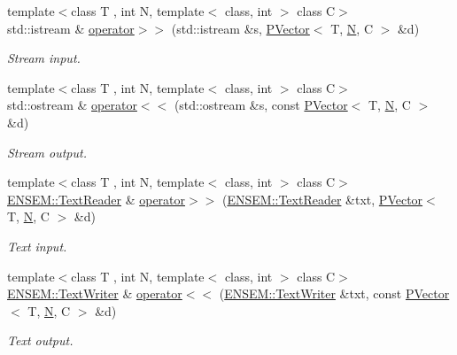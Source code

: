 \begin{DoxyCompactItemize}
{\footnotesize template$<$class T , int N, template$<$ class, int $>$ class C$>$ }\\std\+::istream \& \mbox{\hyperlink{group__primvector_ga4bea3f831d6562a5cb0379de835c6843}{operator$>$$>$}} (std\+::istream \&s, \mbox{\hyperlink{classENSEM_1_1PVector}{P\+Vector}}$<$ T, \mbox{\hyperlink{operator__name__util_8cc_a7722c8ecbb62d99aee7ce68b1752f337}{N}}, C $>$ \&d)
\begin{DoxyCompactList}\small\item\em Stream input. \end{DoxyCompactList}\item 
{\footnotesize template$<$class T , int N, template$<$ class, int $>$ class C$>$ }\\std\+::ostream \& \mbox{\hyperlink{group__primvector_ga6745ec17233acc0af26851238d72789a}{operator$<$$<$}} (std\+::ostream \&s, const \mbox{\hyperlink{classENSEM_1_1PVector}{P\+Vector}}$<$ T, \mbox{\hyperlink{operator__name__util_8cc_a7722c8ecbb62d99aee7ce68b1752f337}{N}}, C $>$ \&d)
\begin{DoxyCompactList}\small\item\em Stream output. \end{DoxyCompactList}\item 
{\footnotesize template$<$class T , int N, template$<$ class, int $>$ class C$>$ }\\\mbox{\hyperlink{classENSEM_1_1TextReader}{E\+N\+S\+E\+M\+::\+Text\+Reader}} \& \mbox{\hyperlink{group__primvector_gae8999766af04f54e1142ab8717a7f742}{operator$>$$>$}} (\mbox{\hyperlink{classENSEM_1_1TextReader}{E\+N\+S\+E\+M\+::\+Text\+Reader}} \&txt, \mbox{\hyperlink{classENSEM_1_1PVector}{P\+Vector}}$<$ T, \mbox{\hyperlink{operator__name__util_8cc_a7722c8ecbb62d99aee7ce68b1752f337}{N}}, C $>$ \&d)
\begin{DoxyCompactList}\small\item\em Text input. \end{DoxyCompactList}\item 
{\footnotesize template$<$class T , int N, template$<$ class, int $>$ class C$>$ }\\\mbox{\hyperlink{classENSEM_1_1TextWriter}{E\+N\+S\+E\+M\+::\+Text\+Writer}} \& \mbox{\hyperlink{group__primvector_gad4763d04d040319fe22a95ca0e2b8932}{operator$<$$<$}} (\mbox{\hyperlink{classENSEM_1_1TextWriter}{E\+N\+S\+E\+M\+::\+Text\+Writer}} \&txt, const \mbox{\hyperlink{classENSEM_1_1PVector}{P\+Vector}}$<$ T, \mbox{\hyperlink{operator__name__util_8cc_a7722c8ecbb62d99aee7ce68b1752f337}{N}}, C $>$ \&d)
\begin{DoxyCompactList}\small\item\em Text output. \end{DoxyCompactList}\item 

\end{DoxyCompactItemize}
